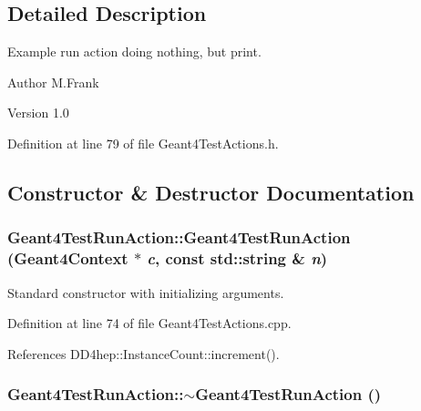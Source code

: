 \subsection{Detailed Description}
Example run action doing nothing, but print. \begin{DoxyAuthor}{Author}
M.Frank 
\end{DoxyAuthor}
\begin{DoxyVersion}{Version}
1.0 
\end{DoxyVersion}


Definition at line 79 of file Geant4TestActions.h.

\subsection{Constructor \& Destructor Documentation}
\hypertarget{class_d_d4hep_1_1_simulation_1_1_test_1_1_geant4_test_run_action_a59369c3b9a84e951c2885a3ec331b360}{
\subsubsection[{Geant4TestRunAction}]{\setlength{\rightskip}{0pt plus 5cm}Geant4TestRunAction::Geant4TestRunAction ({\bf Geant4Context} $\ast$ {\em c}, \/  const std::string \& {\em n})}}
\label{class_d_d4hep_1_1_simulation_1_1_test_1_1_geant4_test_run_action_a59369c3b9a84e951c2885a3ec331b360}


Standard constructor with initializing arguments. 

Definition at line 74 of file Geant4TestActions.cpp.

References DD4hep::InstanceCount::increment().\hypertarget{class_d_d4hep_1_1_simulation_1_1_test_1_1_geant4_test_run_action_a6ce0a9785be8b5d86be20d2bc5a3db64}{
\subsubsection[{$\sim$Geant4TestRunAction}]{\setlength{\rightskip}{0pt plus 5cm}Geant4TestRunAction::$\sim$Geant4TestRunAction ()}}
\label{class_d_d4hep_1_1_simulation_1_1_test_1_1_geant4_test_run_action_a6ce0a9785be8b5d86be20d2bc5a3db64}



